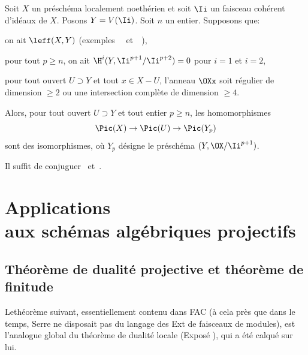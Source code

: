 \begin{theoreme} \label{XI.3.18}
Soit $X$ un pr\'esch\'ema localement noeth\'erien et soit $\Ii$ un faisceau coh\'erent d'id\'eaux de $X$. Posons $Y=V(\Ii)$. Soit $n$ un entier. Supposons que:
\begin{enumeratei}
\item
on ait $\leff(X, Y)$ (\cf exemples ~~et~~),
\item
pour tout $p\geq n$, on ait $\H^i(Y, \Ii^{p+1}/\Ii^{p+2})=0$ pour $i=1$ et $i=2$,
\item
pour tout ouvert $U\supset Y$ et tout $x\in X-U$, l'anneau $\OXx$ soit r\'egulier de dimension $\geq 2$ ou une intersection compl\`ete de dimension $\geq 4$.
\end{enumeratei}
\noindent
Alors, pour tout ouvert $U\supset Y$ et tout entier $p\geq n$, les homomorphismes
\[
\Pic(X)\to\Pic(U)\to\Pic(Y_p)
\]
sont des isomorphismes, o\`u $Y_p$ d\'esigne le pr\'esch\'ema $(Y, \OX/\Ii^{p+1})$.
\end{theoreme}

Il suffit de conjuguer ~et~.

\chapter[Applications aux sch\'emas alg\'ebriques projectifs]
{Applications\\ aux sch\'emas alg\'ebriques projectifs} \label{XII}

\renewcommand{\theequation}{\arabic{equation}}

\section[Th\'eor\`eme de dualit\'e projective et th\'eor\`eme de finitude]
{Th\'eor\`eme de dualit\'e projective et th\'eor\`eme de finitude\protect\sfootnotemark}\label{XII.1}

Le\pageoriginale th\'eor\`eme suivant, essentiellement contenu dans FAC (\`a cela pr\`es que dans le temps, Serre ne disposait pas du langage des Ext de faisceaux de modules), est l'analogue global du th\'eor\`eme de dualit\'e locale (Expos\'e ), qui a \'et\'e calqu\'e sur lui.

